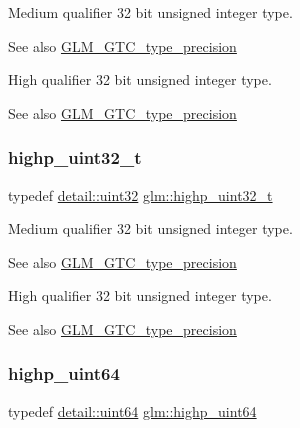 Medium qualifier 32 bit unsigned integer type. \begin{DoxySeeAlso}{See also}
\mbox{\hyperlink{group__gtc__type__precision}{G\+L\+M\+\_\+\+G\+T\+C\+\_\+type\+\_\+precision}}
\end{DoxySeeAlso}
High qualifier 32 bit unsigned integer type. \begin{DoxySeeAlso}{See also}
\mbox{\hyperlink{group__gtc__type__precision}{G\+L\+M\+\_\+\+G\+T\+C\+\_\+type\+\_\+precision}} 
\end{DoxySeeAlso}
\mbox{\label{group__gtc__type__precision_ga8eb85ad460079c63b68866ae34637bda}} 
\subsubsection{\texorpdfstring{highp\+\_\+uint32\+\_\+t}{highp\_uint32\_t}}
{\footnotesize\ttfamily typedef \mbox{\hyperlink{namespaceglm_1_1detail_ade6cfbf377022aaa391af8cd50489222}{detail\+::uint32}} \mbox{\hyperlink{group__gtc__type__precision_ga8eb85ad460079c63b68866ae34637bda}{glm\+::highp\+\_\+uint32\+\_\+t}}}

Medium qualifier 32 bit unsigned integer type. \begin{DoxySeeAlso}{See also}
\mbox{\hyperlink{group__gtc__type__precision}{G\+L\+M\+\_\+\+G\+T\+C\+\_\+type\+\_\+precision}}
\end{DoxySeeAlso}
High qualifier 32 bit unsigned integer type. \begin{DoxySeeAlso}{See also}
\mbox{\hyperlink{group__gtc__type__precision}{G\+L\+M\+\_\+\+G\+T\+C\+\_\+type\+\_\+precision}} 
\end{DoxySeeAlso}
\mbox{\label{group__gtc__type__precision_ga8079c653e20cda03d34b99de629a7b09}} 
\subsubsection{\texorpdfstring{highp\+\_\+uint64}{highp\_uint64}}
{\footnotesize\ttfamily typedef \mbox{\hyperlink{namespaceglm_1_1detail_adec4b19bf4982125e122db2fe03c5810}{detail\+::uint64}} \mbox{\hyperlink{group__gtc__type__precision_ga8079c653e20cda03d34b99de629a7b09}{glm\+::highp\+\_\+uint64}}}

